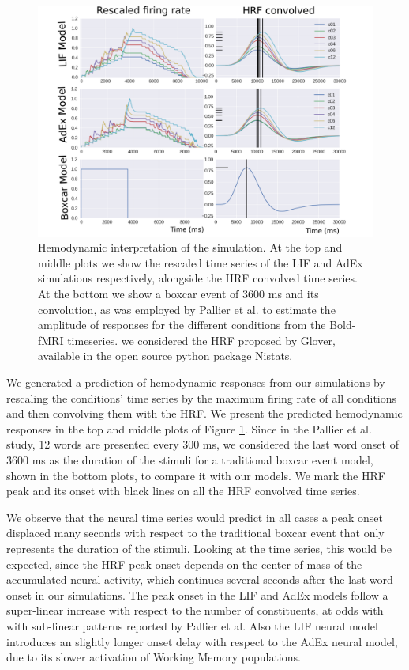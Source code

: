 \documentclass[10pt]{article}
\begin{document}
\begin{figure}[h!]
  \begin{center}
    \includegraphics[width=1.00\columnwidth]{figures/pnas_comparison-01}
    \caption{{Hemodynamic interpretation of the simulation.
    At the top and middle plots we show the rescaled time series of the LIF and AdEx simulations respectively, alongside the HRF convolved time series.
    At the bottom we show a boxcar event of 3600 ms and its convolution, as was employed by Pallier et al. to estimate the amplitude of responses for the different conditions from the Bold-fMRI timeseries.
    we considered the HRF proposed by Glover, available in the open source python package Nistats.
     {\label{fig:pnas-1}}%
      }}
  \end{center}
\end{figure}


We generated a prediction of hemodynamic responses from our simulations by rescaling the conditions' time series by the maximum firing rate of all conditions and then convolving them with the HRF.
We present the predicted hemodynamic responses in the top and middle plots of Figure \ref{fig:pnas-1}.
Since in the Pallier et al. study, 12 words are presented every 300 ms, we considered the last word onset of 3600 ms as the duration of the stimuli for a traditional boxcar event model, shown in the bottom plots, to compare it with our models.
We mark the HRF peak and its onset with black lines on all the HRF convolved time series.

We observe that the neural time series would predict in all cases a peak onset displaced many seconds with respect to the traditional boxcar event that only represents the duration of the stimuli.
Looking at the time series, this would be expected, since the HRF peak onset depends on the center of mass of the accumulated neural activity, which continues several seconds after the last word onset in our simulations.
The peak onset in the LIF and AdEx models follow a super-linear increase with respect to the number of constituents, at odds with with sub-linear patterns reported by Pallier et al.
Also the LIF neural model introduces an slightly longer onset delay with respect to the AdEx neural model, due to its slower activation of Working Memory populations.
\end{document}
